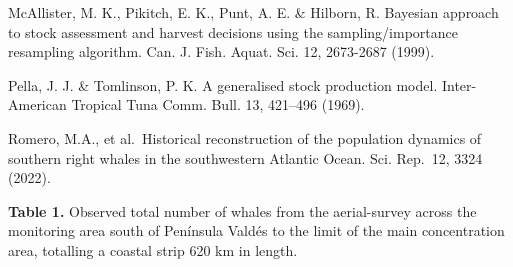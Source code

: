 \documentclass[
]{article}
\begin{document}
McAllister, M. K., Pikitch, E. K., Punt, A. E. \& Hilborn, R. Bayesian
approach to stock assessment and harvest decisions using the
sampling/importance resampling algorithm. Can. J. Fish. Aquat. Sci. 12,
2673-2687 (1999).

Pella, J. J. \& Tomlinson, P. K. A generalised stock production model.
Inter-American Tropical Tuna Comm. Bull. 13, 421--496 (1969).

Romero, M.A., et al.~Historical reconstruction of the population
dynamics of southern right whales in the southwestern Atlantic Ocean.
Sci. Rep.~12, 3324 (2022).

\newpage

\textbf{Table 1.} Observed total number of whales from the aerial-survey
across the monitoring area south of Península Valdés to the limit of the
main concentration area, totalling a coastal strip 620 km in length.
\end{document}
